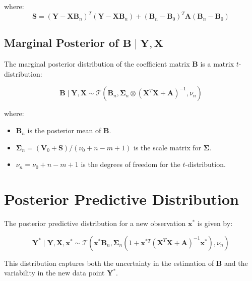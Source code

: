 \documentclass{article}
\begin{document}
where:
\[
\bm{S} = (\bm{Y} - \bm{X} \bm{B}_n)^T (\bm{Y} - \bm{X} \bm{B}_n) + (\bm{B}_n - \bm{B}_0)^T \bm{A} (\bm{B}_n - \bm{B}_0)
\]

\subsection{Marginal Posterior of \(\bm{B} \mid \bm{Y}, \bm{X}\)}

The marginal posterior distribution of the coefficient matrix \(\bm{B}\) is a matrix \(t\)-distribution:

\[
\bm{B} \mid \bm{Y}, \bm{X} \sim \mathcal{T}(\bm{B}_n, \bm{\Sigma}_n \otimes (\bm{X}^T \bm{X} + \bm{A})^{-1}, \nu_n)
\]

where:
\begin{itemize}
    \item \(\bm{B}_n\) is the posterior mean of \(\bm{B}\).
    \item \(\bm{\Sigma}_n = (\bm{V}_0 + \bm{S}) / (\nu_0 + n - m + 1)\) is the scale matrix for \(\bm{\Sigma}\).
    \item \(\nu_n = \nu_0 + n - m + 1\) is the degrees of freedom for the \(t\)-distribution.
\end{itemize}

\section{Posterior Predictive Distribution}

The posterior predictive distribution for a new observation \(\bm{x}^*\) is given by:

\[
\bm{Y}^* \mid \bm{Y}, \bm{X}, \bm{x}^* \sim \mathcal{T}(\bm{x}^* \bm{B}_n, \bm{\Sigma}_n (1 + \bm{x}^{*T} (\bm{X}^T \bm{X} + \bm{A})^{-1} \bm{x}^*), \nu_n)
\]

This distribution captures both the uncertainty in the estimation of \(\bm{B}\) and the variability in the new data point \(\bm{Y}^*\).
\end{document}
